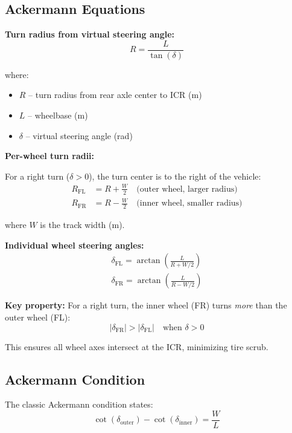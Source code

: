\documentclass[11pt,a4paper]{article}
\begin{document}
\subsection{Ackermann Equations}

\textbf{Turn radius from virtual steering angle:}
\begin{equation}
\boxed{R = \frac{L}{\tan(\delta)}}
\label{eq:turn_radius}
\end{equation}

where:
\begin{itemize}
    \item $R$ -- turn radius from rear axle center to ICR (m)
    \item $L$ -- wheelbase (m)
    \item $\delta$ -- virtual steering angle (rad)
\end{itemize}

\textbf{Per-wheel turn radii:}

For a right turn ($\delta > 0$), the turn center is to the right of the vehicle:
\begin{align}
R_{\text{FL}} &= R + \frac{W}{2} \quad \text{(outer wheel, larger radius)} \\
R_{\text{FR}} &= R - \frac{W}{2} \quad \text{(inner wheel, smaller radius)}
\end{align}

where $W$ is the track width (m).

\textbf{Individual wheel steering angles:}
\begin{align}
\boxed{\delta_{\text{FL}} = \arctan\left(\frac{L}{R + W/2}\right)} \label{eq:delta_fl} \\
\boxed{\delta_{\text{FR}} = \arctan\left(\frac{L}{R - W/2}\right)} \label{eq:delta_fr}
\end{align}

\textbf{Key property:} For a right turn, the inner wheel (FR) turns \textit{more} than the outer wheel (FL):
\begin{equation}
|\delta_{\text{FR}}| > |\delta_{\text{FL}}| \quad \text{when } \delta > 0
\end{equation}

This ensures all wheel axes intersect at the ICR, minimizing tire scrub.

\subsection{Ackermann Condition}

The classic Ackermann condition states:
\begin{equation}
\boxed{\cot(\delta_{\text{outer}}) - \cot(\delta_{\text{inner}}) = \frac{W}{L}}
\label{eq:ackermann_condition}
\end{equation}
\end{document}
